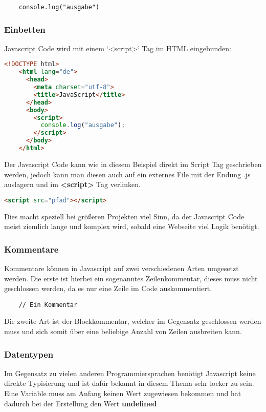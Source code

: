 \begin{lstlisting}
    console.log("ausgabe")
\end{lstlisting}
\newpage
\subsubsection{Einbetten}
Javascript Code wird mit einem `<script>` Tag im HTML eingebunden:

\begin{lstlisting}[language=html, caption=Javascript Code Body Einbindung]
    <!DOCTYPE html>
    <html lang="de">
      <head>
        <meta charset="utf-8">
        <title>JavaScript</title>
      </head>
      <body>
        <script>
          console.log("ausgabe");
        </script>
      </body>
    </html>
\end{lstlisting}

Der Javascript Code kann wie in diesem Beispiel direkt im Script Tag geschrieben werden, jedoch kann man diesen auch auf ein externes File mit der Endung .js auslagern und im \textbf{<script>} Tag verlinken. 

\begin{lstlisting}[language=html]
    <script src="pfad"></script>
\end{lstlisting}

Dies macht speziell bei größeren Projekten viel Sinn, da der Javascript Code meist ziemlich lange und komplex wird, sobald eine Webseite viel Logik benötigt.

\subsubsection{Kommentare}
Kommentare können in Javascript auf zwei verschiedenen Arten umgesetzt werden. Die erste ist hierbei ein sogenanntes Zeilenkommentar, dieses muss nicht geschlossen werden, da es nur eine Zeile im Code auskommentiert.

\begin{lstlisting}
    // Ein Kommentar
\end{lstlisting}

Die zweite Art ist der Blockkommentar, welcher im Gegensatz geschlossen werden muss und sich somit über eine beliebige Anzahl von Zeilen ausbreiten kann.


\subsubsection{Datentypen}
Im Gegensatz zu vielen anderen Programmiersprachen benötigt Javascript keine direkte Typisierung und ist dafür bekannt in diesem Thema sehr locker zu sein.
\newline
Eine Variable muss am Anfang keinen Wert zugewiesen bekommen und hat dadurch bei der Erstellung den Wert \textbf{undefined}

